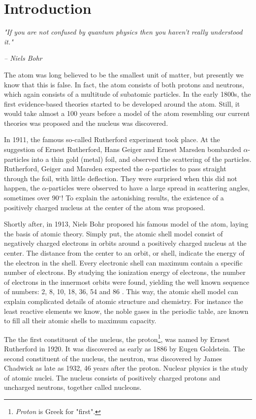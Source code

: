 \documentclass[twoside,english]{uiofysmaster/uiofysmaster}
\begin{document}
\chapter{Introduction}\label{ch:intro}
\epigraph{\textit{"If you are not confused by quantum physics then you haven't really understood it."}}{\textit{– Niels Bohr}}


The atom was long believed to be the smallest unit of matter, but presently we know that this is false. 
In fact, the atom consists of both protons and neutrons, which again consists of a multitude of subatomic particles.
In the early 1800s, the first evidence-based theories started to be developed around the atom.
Still, it would take almost a 100 years before a model of the atom resembling our current theories was proposed and the nucleus was discovered. 

In 1911, the famous so-called Rutherford experiment took place.
At the suggestion of Ernest Rutherford, Hans Geiger and Ernest Marsden bombarded $\alpha$-particles into a thin gold (metal) foil, and observed the scattering of the particles.
Rutherford, Geiger and Marsden expected the $\alpha$-particles to pass straight through the foil, with little deflection. 
They were surprised when this did not happen, the $\alpha$-particles were observed to have a large spread in scattering angles, sometimes over 90$^\circ$!
To explain the astonishing results, the existence of a positively charged nucleus at the center of the atom was proposed. 

Shortly after, in 1913, Niels Bohr proposed his famous model of the atom, laying the basis of atomic theory.
Simply put, the atomic shell model consist of negatively charged electrons in orbits around a positively charged nucleus at the center. 
The distance from the center to an orbit, or shell, indicate the energy of the electron in the shell. 
Every electronic shell can maximum contain a specific number of electrons. 
By studying the ionization energy of electrons, the number of electrons in the innermost orbits were found, yielding the well known sequence of numbers: 2, 8, 10, 18, 36, 54 and 86 \cite{Heyde}. 
This way, the atomic shell model can explain complicated details of atomic structure and chemistry. 
For instance the least reactive elements we know, the noble gases in the periodic table, are known to fill all their atomic shells to maximum capacity.

The the first constituent of the nucleus, the proton\footnote{\textit{Proton} is Greek for "first".}, was named by Ernest Rutherford in 1920. It was discovered as early as 1886 by Eugen Goldstein. The second constituent of the nucleus, the neutron, was discovered by James Chadwick as late as 1932, 46 years after the proton.
Nuclear physics is the study of atomic nuclei. 
The nucleus consists of positively charged protons and uncharged neutrons, together called nucleons. 
\end{document}
